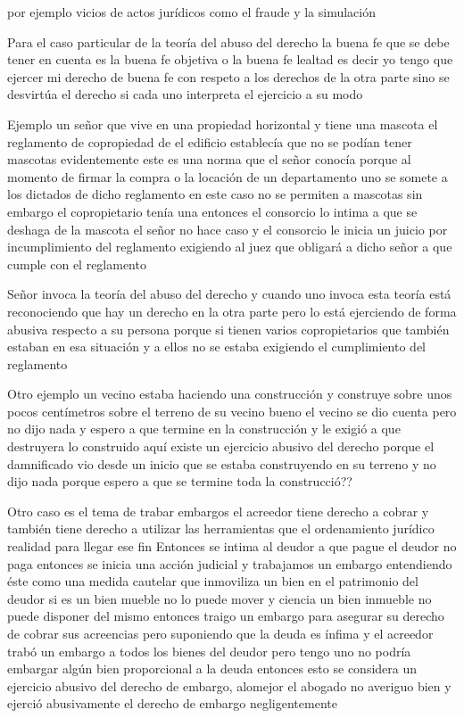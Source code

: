 \documentclass[12pt]{book}
\begin{document}
por ejemplo vicios de actos jurídicos como el fraude y la simulación

Para el caso particular de la teoría del abuso del derecho la buena fe que se debe tener en cuenta es la buena fe objetiva o la buena fe lealtad es decir yo tengo que ejercer mi derecho de buena fe con respeto a los derechos de la otra parte sino se desvirtúa el derecho si cada uno interpreta el ejercicio a su modo

Ejemplo un señor que vive en una propiedad horizontal y tiene una mascota el reglamento de copropiedad de el edificio establecía que no se podían tener mascotas evidentemente este es una norma que el señor conocía porque al momento de firmar la compra o la locación de un departamento uno se somete a los dictados de dicho reglamento en este caso no se permiten a mascotas sin embargo el copropietario tenía una entonces el consorcio lo intima a que se deshaga de la mascota el señor no hace caso y el consorcio le inicia un juicio por incumplimiento del reglamento exigiendo al juez que obligará a dicho señor a que cumple con el reglamento

Señor invoca la teoría del abuso del derecho y cuando uno invoca esta teoría está reconociendo que hay un derecho en la otra parte pero lo está ejerciendo de forma abusiva respecto a su persona porque si tienen varios copropietarios que también estaban en esa situación y a ellos no se estaba exigiendo el cumplimiento del reglamento

Otro ejemplo un vecino estaba haciendo una construcción y construye sobre unos pocos centímetros sobre el terreno de su vecino bueno el vecino se dio cuenta pero no dijo nada y espero a que termine en la construcción y le exigió a que destruyera lo construido aquí existe un ejercicio abusivo del derecho porque el damnificado vio desde un inicio que se estaba construyendo en su terreno y no dijo nada porque espero a que se termine toda la construcció??

Otro caso es el tema de trabar embargos el acreedor tiene derecho a cobrar y también tiene derecho a utilizar las herramientas que el ordenamiento jurídico realidad para llegar ese fin
Entonces se intima al deudor a que pague el deudor no paga entonces se inicia una acción judicial y trabajamos un embargo entendiendo éste como una medida cautelar que inmoviliza un bien en el patrimonio del deudor si es un bien mueble no lo puede mover y ciencia un bien inmueble no puede disponer del mismo entonces traigo un embargo para asegurar su derecho de cobrar sus acreencias pero suponiendo que la deuda es ínfima y el acreedor trabó un embargo a todos los bienes del deudor pero tengo uno no podría embargar algún bien proporcional a la deuda entonces esto se considera un ejercicio abusivo del derecho de embargo, alomejor el abogado no averiguo bien y ejerció abusivamente el derecho de embargo negligentemente
\end{document}
